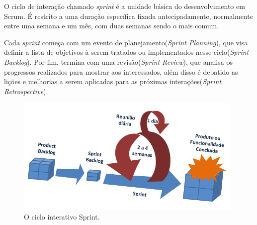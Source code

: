 \par O ciclo de interação chamado \emph{sprint} é a unidade básica do desenvolvimento em Scrum. É restrito a uma duração específica fixada antecipadamente, normalmente entre uma semana e um mês, com duas semanas sendo o mais comum.
\par Cada \emph{sprint} começa com um evento de planejamento(\emph{Sprint Planning}), que visa definir a lista de objetivos à serem tratados ou implementados nesse ciclo(\emph{Sprint Backlog}). Por fim, termina com uma revisão(\emph{Sprint Review}), que analisa os progressos realizados para mostrar aos interessados, além disso é debatido as lições e melhorias a serem aplicadas para as próximas interações(\emph{Sprint Retrospective}).
\begin{figure}[!htb]
\centering
\includegraphics[width=11cm]{figuras/scrum_process}
\caption{\label{fig:scrum_process}O ciclo interativo Sprint.}
\end{figure}
